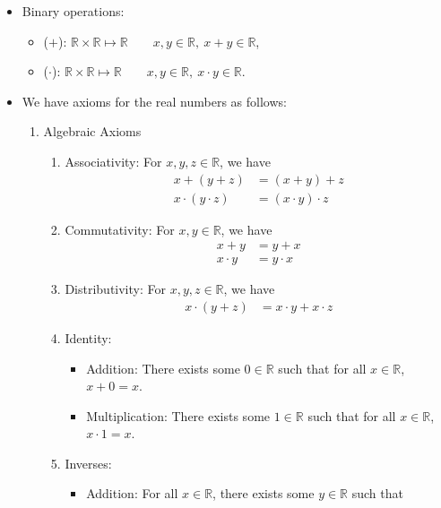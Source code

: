 \documentclass{article}
\newcommand{\R}{\mathbb{R}}
\newcommand{\?}{\stackrel{?}{=}}
\newcommand{\smallblacksquare}{\rule{0.5em}{0.5em}}
\theoremstyle{definition} %
\begin{document}
\begin{itemize}
    \item Binary operations:
    \begin{itemize}[label=$\smallblacksquare$]
        \item ($+$): $\R \times \R \mapsto \R \qquad x, y \in \R, \ x + y \in \R$,
        \item ($\cdot$): $\R \times \R \mapsto \R \qquad x, y \in \R, \ x \cdot y \in \R$.
    \end{itemize}
    \item We have axioms for the real numbers as follows:
    \begin{enumerate}[label=\Roman*]
        \item Algebraic Axioms
        \begin{enumerate}[label=(\roman*)]
            \item Associativity: For $x, y, z \in \R$, we have
            \begin{align*}
                x + (y + z) &= (x + y) + z \\
                x \cdot (y \cdot z) &= (x \cdot y) \cdot z
            \end{align*}
            \item Commutativity: For $x, y \in \R$, we have
            \begin{align*}
                x + y &= y + x \\
                x \cdot y &= y \cdot x
            \end{align*}
            \item Distributivity: For $x, y, z \in \R$, we have
            \begin{align*}
                x \cdot (y + z) &= x \cdot y + x \cdot z
            \end{align*}
            \item Identity:
            \begin{itemize}[label=$\smallblacksquare$]
                \item Addition: There exists some $0 \in \R$ such that for all $x \in \R$, $x + 0 = x$.
                \item Multiplication: There exists some $1 \in \R$ such that for all $x \in \R$, $x \cdot 1 = x$.
            \end{itemize} 
            \item Inverses:
            \begin{itemize}[label=$\smallblacksquare$]
                \item Addition: For all $x \in \R$, there exists some $y \in \R$ such that

\end{itemize}
\end{enumerate}
\end{enumerate}
\end{itemize}
\end{document}
